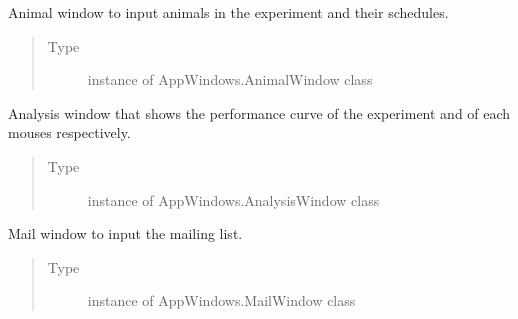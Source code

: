 \documentclass[letterpaper,10pt,english]{sphinxmanual}
\begin{document}
\begin{fulllineitems}
\begin{fulllineitems}
\begin{quote}
\begin{description}
\end{description}\end{quote}

\end{fulllineitems}


\begin{fulllineitems}
\label{\detokenize{NoSeMazeController/main:main.MainApp.animal_window}}
\pysigstartsignatures
{}
\pysigstopsignatures
\sphinxAtStartPar
Animal window to input animals in the experiment and their schedules.
\begin{quote}\begin{description}
\item[{Type}] \leavevmode
\sphinxAtStartPar
instance of AppWindows.AnimalWindow class

\end{description}\end{quote}

\end{fulllineitems}


\begin{fulllineitems}
\label{\detokenize{NoSeMazeController/main:main.MainApp.analysis_window}}
\pysigstartsignatures
{}
\pysigstopsignatures
\sphinxAtStartPar
Analysis window that shows the performance curve of the experiment and of
each mouses respectively.
\begin{quote}\begin{description}
\item[{Type}] \leavevmode
\sphinxAtStartPar
instance of AppWindows.AnalysisWindow class

\end{description}\end{quote}

\end{fulllineitems}


\begin{fulllineitems}
\label{\detokenize{NoSeMazeController/main:main.MainApp.mail_window}}
\pysigstartsignatures
{}
\pysigstopsignatures
\sphinxAtStartPar
Mail window to input the mailing list.
\begin{quote}\begin{description}
\item[{Type}] \leavevmode
\sphinxAtStartPar
instance of AppWindows.MailWindow class


\end{description}
\end{quote}
\end{fulllineitems}
\end{fulllineitems}
\end{document}
